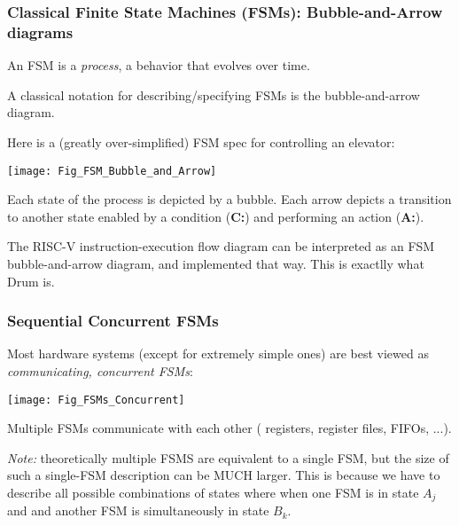 \begin{frame}[fragile]
\frametitle{Classical Finite State Machines (FSMs): Bubble-and-Arrow diagrams}

\footnotesize

An FSM is a \emph{process}, a behavior that evolves over time.

\vspace{1ex}

A classical notation for describing/specifying FSMs is the bubble-and-arrow diagram.

\vspace{1ex}

Here is a (greatly over-simplified) FSM spec for controlling an elevator:

\begin{center}
\texttt{[image: Fig\_FSM\_Bubble\_and\_Arrow]}
\end{center}

Each state of the process is depicted by a bubble.  Each arrow depicts
a transition to another state enabled by a condition ({\bf C:}) and
performing an action ({\bf A:}).

\PAUSE{\vspace{5ex}}

The RISC-V instruction-execution flow diagram can be interpreted as an
FSM bubble-and-arrow diagram, and implemented that way.  This is
exactlly what Drum is.

\end{frame}


\begin{frame}[fragile]
\frametitle{Sequential {\vs} Concurrent FSMs}

\footnotesize

Most hardware systems (except for extremely simple ones) are best viewed as \emph{communicating, concurrent FSMs}:

\begin{center}
\texttt{[image: Fig\_FSMs\_Concurrent]}
\end{center}

Multiple FSMs communicate with each other ({\via} registers, register files, FIFOs, ...).

\PAUSE{\vspace{5ex}}

\emph{Note:} theoretically multiple FSMS are equivalent to a single FSM, but
the size of such a single-FSM description can be MUCH larger.  This is
because we have to describe all possible combinations of states where
when one FSM is in state $A_j$ and and another FSM is simultaneously
in state $B_k$.

\end{frame}

